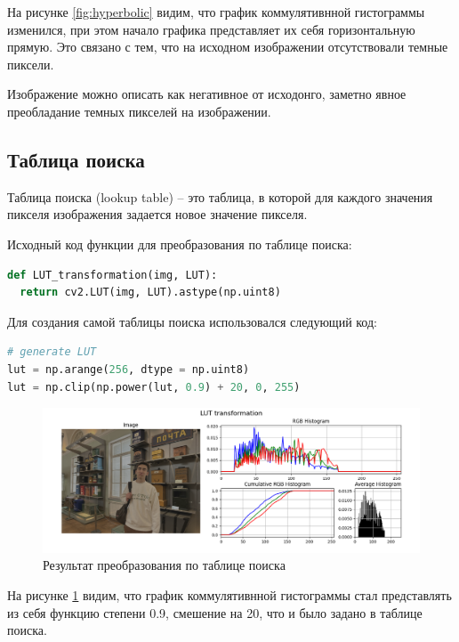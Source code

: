 На рисунке \ref{fig:hyperbolic} видим, что график коммулятивнной гистограммы изменился, при этом начало графика представляет их себя горизонтальную
прямую. Это связано с тем, что на исходном изображении отсутствовали темные пиксели. 

Изображение можно описать как негативное от исходонго, заметно явное преобладание темных пикселей на изображении.

\subsection{Таблица поиска}

Таблица поиска (lookup table) -- это таблица, в которой для каждого значения пикселя изображения задается новое значение пикселя.

Исходный код функции для преобразования по таблице поиска:

\begin{lstlisting}[language=Python]
def LUT_transformation(img, LUT):
  return cv2.LUT(img, LUT).astype(np.uint8)
\end{lstlisting}

Для создания самой таблицы поиска использовался следующий код:  

\begin{lstlisting}[language=Python]
# generate LUT 
lut = np.arange(256, dtype = np.uint8)
lut = np.clip(np.power(lut, 0.9) + 20, 0, 255)
\end{lstlisting}

\begin{figure}[H]
    \centering
    \includegraphics[width=\textwidth]{../results/LUT transformation.png}
    \caption{Результат преобразования по таблице поиска}
    \label{fig:lut}
\end{figure}

На рисунке \ref{fig:lut} видим, что график коммулятивнной гистограммы стал представлять из себя функцию степени 0.9, смешение на 20, что и было задано в таблице поиска.  

